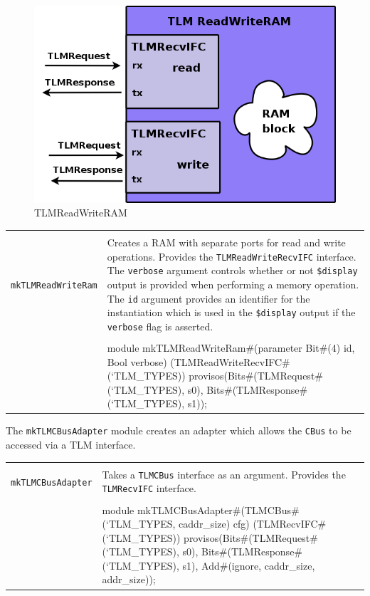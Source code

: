 \documentclass[twoside,letterpaper]{article}
\newcommand{\te}[1]{\texttt{#1}}
\newenvironment{libverbatim}
  {\vspace*{-1.0em}
   \verbatim}
  {\endverbatim
  }
\begin{document}
\begin{figure}[ht]
\begin{center}
\includegraphics[height = 1.5 in]{TLMReadWriteRAM}
\caption{TLMReadWriteRAM}
\label{rwram}
\end{center}
\end{figure}


\begin{center}
\begin{tabular}{|p{1.2 in}|p{5 in}|}
\hline 
&\\

\te{mkTLMReadWriteRam}&Creates a RAM with separate ports for read 
and write operations.  Provides the \te{TLMReadWriteRecvIFC}
interface. The \te{verbose} argument controls whether or not
\te{\$display} output is provided when performing a memory
operation. The \te{id} argument provides an identifier for the
instantiation which is used in the \te{\$display} output if the
\te{verbose} flag is asserted. \\
&\\
\cline{2-2}
&\begin{libverbatim}
module mkTLMReadWriteRam#(parameter Bit#(4) id, Bool verbose) 
                         (TLMReadWriteRecvIFC#(`TLM_TYPES))
   provisos(Bits#(TLMRequest#(`TLM_TYPES),  s0),
            Bits#(TLMResponse#(`TLM_TYPES), s1));
\end{libverbatim}
\\
\hline
\end{tabular}
\end{center}

The \te{mkTLMCBusAdapter} module creates an adapter which allows the
\te{CBus} to be accessed via a TLM interface.

\begin{center}
\begin{tabular}{|p{1.2 in}|p{5 in}|}
\hline 
&\\
\te{mkTLMCBusAdapter}&Takes a \te{TLMCBus} interface as an argument.
Provides the \te{TLMRecvIFC} interface. \\ 
&\\
\cline{2-2}
&\begin{libverbatim}
module mkTLMCBusAdapter#(TLMCBus#(`TLM_TYPES, caddr_size) cfg)
                        (TLMRecvIFC#(`TLM_TYPES))
   provisos(Bits#(TLMRequest#(`TLM_TYPES),  s0),
	    Bits#(TLMResponse#(`TLM_TYPES), s1),
	    Add#(ignore, caddr_size, addr_size));
\end{libverbatim}
\\
\hline
\end{tabular}
\end{center}
\end{document}
